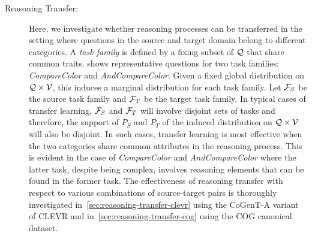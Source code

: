 \begin{description}
	\item[Reasoning Transfer:]
	Here, we investigate whether reasoning processes can be transferred in the setting where questions in the source and target domain belong to different categories.
	A \emph{task family} is defined by a fixing subset of $\mathcal{Q}$ that share common traits.
	 shows representative questions for two task families: \textit{CompareColor} and \textit{AndCompareColor}.
	Given a fixed global distribution on $\mathcal{Q} \times \mathcal{V}$, this induces a marginal distribution for each task family.
	Let $\mathcal{F}_S$ be the source task family and $\mathcal{F}_T$ be the target task family.
	In typical cases of transfer learning, $\mathcal{F}_S$ and $\mathcal{F}_T$ will involve disjoint sets of tasks and therefore, the support of $P_S$ and $P_T$ of the induced distribution on $\mathcal{Q} \times \mathcal{V}$ will also be disjoint.
	In such cases, transfer learning is most effective when the two categories share common attributes in the reasoning process. This is evident in the case of \textit{CompareColor} and \textit{AndCompareColor} where the latter task, despite being complex, involves reasoning elements that can be found in the former task. The effectiveness of reasoning transfer with respect to various combinations of source-target pairs is thoroughly investigated in~\cref{sec:reasoning-transfer-clevr} using the CoGenT-A variant of CLEVR and in~\cref{sec:reasoning-transfer-cog} using the COG canonical dataset.
	


\end{description}

